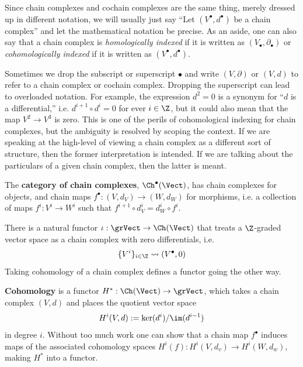 \begin{rmk}
Since chain complexes and cochain complexes are the same thing, merely dressed up in different notation, we will usually just say ``Let $(V^{\bullet},d^{\bullet})$ be a chain complex'' and let the mathematical notation be precise. As an aside, one can also say that a chain complex is \emph{homologically indexed} if it is written as $(V_{\bullet},\partial_{\bullet})$ or \emph{cohomologically indexed} if it is written as $(V^{\bullet},d^{\bullet})$.
\end{rmk}

\begin{rem}
Sometimes we drop the subscript or superscript $\bullet$ and write $(V,\partial)$ or $(V,d)$ to refer to a chain complex or cochain complex. Dropping the superscript can lead to overloaded notation. For example, the expression $d^2=0$ is a synonym for ``$d$ is a differential,'' i.e. $d^{i+1}\circ d^i=0$ for ever $i\in\Z$, but it could also mean that the map $V^2\to V^3$ is zero. This is one of the perils of cohomological indexing for chain complexes, but the ambiguity is resolved by scoping the context. If we are speaking at the high-level of viewing a chain complex as a different sort of structure, then the former interpretation is intended. If we are talking about the particulars of a given chain complex, then the latter is meant. 
\end{rem}

\begin{defn}
The \textbf{category of chain complexes}, $\Ch^{\bullet}(\Vect)$, has chain complexes for objects, and chain maps $f^{\bullet}:(V,d_V)\to (W,d_W)$ for morphisms, i.e. a collection of maps $f^i:V^i\to W^i$ such that $f^{i+1}\circ d^i_V=d^i_W\circ f^i$.
\end{defn}

There is a natural functor $\iota: \grVect\to\Ch(\Vect)$ that treats a $\Z$-graded vector space as a chain complex with zero differentials, i.e.
\[
\{V^i\}_{i\in\Z} \rightsquigarrow (V^{\bullet},0)
\]
Taking cohomology of a chain complex defines a functor going the other way.

\begin{defn}
\textbf{Cohomology} is a functor $H^{\ast}:\Ch(\Vect)\to\grVect$, which takes a chain complex $(V,d)$ and places the quotient vector space 
\[
H^i(V,d):=\ker(d^i)/\im(d^{i-1})
\] 
in degree $i$. Without too much work one can show that a chain map $f^{\bullet}$ induces maps of the associated cohomology spaces $H^i(f):H^i(V,d_v)\to H^i(W,d_w)$, making $H^{\ast}$ into a functor.
\end{defn}

